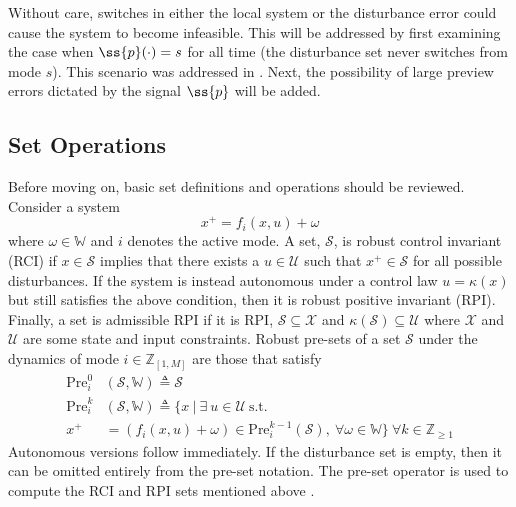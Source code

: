 Without care, switches in either the local system or the disturbance error could cause the system to become infeasible. This will be addressed by first examining the case when $\ss{p}(\cdot)=s$ for all time (the disturbance set never switches from mode $s$). This scenario was addressed in \cite{Lavaei2021}. Next, the possibility of large preview errors dictated by the signal $\ss{p}$ will be added.

\subsection{Set Operations}
Before moving on, basic set definitions and operations should be reviewed. Consider a system 
$$x^+=f_i(x,u)+\omega$$
where $\omega\in\mathbb{W}$ and $i$ denotes the active mode. A set, $\mathcal{S}$, is robust control invariant (RCI) if $x\in\mathcal{S}$ implies that there exists a $u\in\mathcal{U}$ such that $x^+\in\mathcal{S}$ for all possible disturbances. If the system is instead autonomous under a control law $u=\kappa(x)$ but still satisfies the above condition, then it is robust positive invariant (RPI). Finally, a set is admissible RPI if it is RPI, $\mathcal{S}\subseteq\mathcal{X}$ and $\kappa(\mathcal{S})\subseteq\mathcal{U}$ where $\mathcal{X}$ and $\mathcal{U}$ are some state and input constraints. 
Robust pre-sets of a set $\mathcal{S}$ under the dynamics of mode $i\in\mathbb{Z}_{[1,M]}$ are those that satisfy
\begin{align*}
    \text{Pre}_i^0&(\mathcal{S},\mathbb{W}) \triangleq\mathcal{S}\\
    \text{Pre}_i^k&(\mathcal{S},\mathbb{W})\triangleq \{x\ |\ \exists\ u\in\mathcal{U}\ \text{s.t. }\\ x^+&= \left(f_i(x,u)+\omega\right)\in\text{Pre}_i^{k-1}(\mathcal{S}),\ \forall\omega\in\mathbb{W}\}\ \forall k\in\mathbb{Z}_{\geq1}
\end{align*}
Autonomous versions follow immediately. If the disturbance set is empty, then it can be omitted entirely from the pre-set notation. The pre-set operator is used to compute the RCI and RPI sets mentioned above \cite{Borrelli2017}.